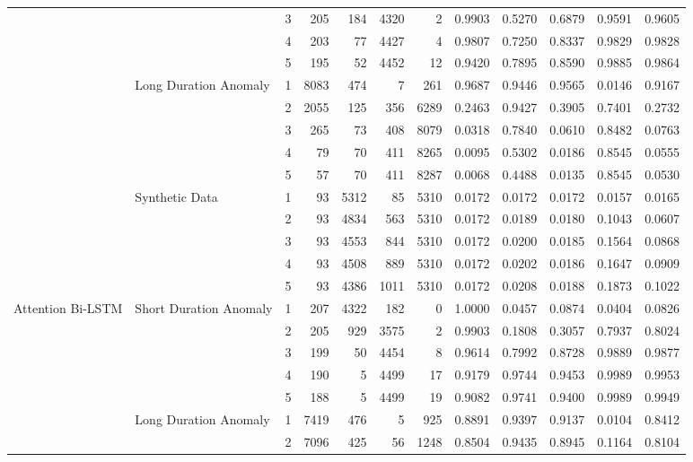 \begin{table}[t]
{\begin{tabular}{|l|l|c|r|r|r|r|c|c|c|c|c|}
 &  & 3 & 205 & 184 & 4320 & 2 & 0.9903 & 0.5270 & 0.6879 & 0.9591 & 0.9605 \\
 &  & 4 & 203 & 77 & 4427 & 4 & 0.9807 & 0.7250 & 0.8337 & 0.9829 & 0.9828 \\
 &  & 5 & 195 & 52 & 4452 & 12 & 0.9420 & 0.7895 & 0.8590 & 0.9885 & 0.9864 \\
\cline{2-12}
 & \multirow{5}{*}{Long Duration Anomaly} & 1 & 8083 & 474 & 7 & 261 & 0.9687 & 0.9446 & 0.9565 & 0.0146 & 0.9167 \\
 &  & 2 & 2055 & 125 & 356 & 6289 & 0.2463 & 0.9427 & 0.3905 & 0.7401 & 0.2732 \\
 &  & 3 & 265 & 73 & 408 & 8079 & 0.0318 & 0.7840 & 0.0610 & 0.8482 & 0.0763 \\
 &  & 4 & 79 & 70 & 411 & 8265 & 0.0095 & 0.5302 & 0.0186 & 0.8545 & 0.0555 \\
 &  & 5 & 57 & 70 & 411 & 8287 & 0.0068 & 0.4488 & 0.0135 & 0.8545 & 0.0530 \\
\cline{2-12}
 & \multirow{5}{*}{Synthetic Data} & 1 & 93 & 5312 & 85 & 5310 & 0.0172 & 0.0172 & 0.0172 & 0.0157 & 0.0165 \\
 &  & 2 & 93 & 4834 & 563 & 5310 & 0.0172 & 0.0189 & 0.0180 & 0.1043 & 0.0607 \\
 &  & 3 & 93 & 4553 & 844 & 5310 & 0.0172 & 0.0200 & 0.0185 & 0.1564 & 0.0868 \\
 &  & 4 & 93 & 4508 & 889 & 5310 & 0.0172 & 0.0202 & 0.0186 & 0.1647 & 0.0909 \\
 &  & 5 & 93 & 4386 & 1011 & 5310 & 0.0172 & 0.0208 & 0.0188 & 0.1873 & 0.1022 \\
\hline
\multirow{15}{*}{Attention Bi-LSTM} & \multirow{5}{*}{Short Duration Anomaly} & 1 & 207 & 4322 & 182 & 0 & 1.0000 & 0.0457 & 0.0874 & 0.0404 & 0.0826 \\
 &  & 2 & 205 & 929 & 3575 & 2 & 0.9903 & 0.1808 & 0.3057 & 0.7937 & 0.8024 \\
 &  & 3 & 199 & 50 & 4454 & 8 & 0.9614 & 0.7992 & 0.8728 & 0.9889 & 0.9877 \\
 &  & 4 & 190 & 5 & 4499 & 17 & 0.9179 & 0.9744 & 0.9453 & 0.9989 & 0.9953 \\
 &  & 5 & 188 & 5 & 4499 & 19 & 0.9082 & 0.9741 & 0.9400 & 0.9989 & 0.9949 \\
\cline{2-12}
 & \multirow{5}{*}{Long Duration Anomaly} & 1 & 7419 & 476 & 5 & 925 & 0.8891 & 0.9397 & 0.9137 & 0.0104 & 0.8412 \\
 &  & 2 & 7096 & 425 & 56 & 1248 & 0.8504 & 0.9435 & 0.8945 & 0.1164 & 0.8104 \\

\end{tabular}}
\end{table}
